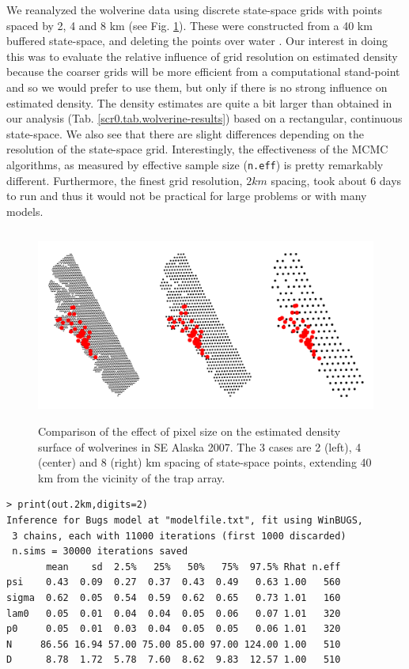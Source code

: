 {{We reanalyzed the wolverine data using discrete state-space grids with
points spaced by 2, 4 and 8 km (see 
Fig. \ref{scr0.fig.wolvgrids}). These were constructed from a 40 km
buffered state-space, and deleting the points over water 
\citep[see][]{royle_etal:2011jwm}.  Our interest in doing this was to
evaluate the relative influence of grid resolution on estimated
density because the coarser grids will be more efficient from a
computational stand-point and so we would prefer to use them, but
only if there is no strong influence on estimated density.
The density estimates are quite a bit larger than obtained in our
analysis 
(Tab. \ref{scr0.tab.wolverine-results})
based on a rectangular, continuous state-space. 
We also see that there are slight differences depending on the
resolution of the state-space grid.
Interestingly, the 
effectiveness of the MCMC algorithms, as measured by effective sample
size (\mbox{\tt n.eff}) is pretty remarkably
different. Furthermore, the finest grid resolution, $2 km$ spacing, took about
6 days to run and thus it would not be practical for large problems or
with many models.

\begin{figure}[ht]
\begin{center}
\includegraphics[height=2.5in,width=5in]{Ch4-SCR0/figs/wolvgrids}
\end{center}
\caption{Comparison of the effect of pixel size on the estimated
  density surface of wolverines in SE Alaska 2007. The 3 cases are 
2 (left), 4 (center) and 8 (right) km spacing of state-space points, extending 
40 km from the vicinity of the trap array. }
\label{scr0.fig.wolvgrids}
\end{figure}

{\small
\begin{verbatim}
> print(out.2km,digits=2)
Inference for Bugs model at "modelfile.txt", fit using WinBUGS,
 3 chains, each with 11000 iterations (first 1000 discarded)
 n.sims = 30000 iterations saved
       mean    sd  2.5%   25%   50%   75%  97.5% Rhat n.eff
psi    0.43  0.09  0.27  0.37  0.43  0.49   0.63 1.00   560
sigma  0.62  0.05  0.54  0.59  0.62  0.65   0.73 1.01   160
lam0   0.05  0.01  0.04  0.04  0.05  0.06   0.07 1.01   320
p0     0.05  0.01  0.03  0.04  0.05  0.05   0.06 1.01   320
N     86.56 16.94 57.00 75.00 85.00 97.00 124.00 1.00   510
D      8.78  1.72  5.78  7.60  8.62  9.83  12.57 1.00   510


\end{verbatim}}}}
